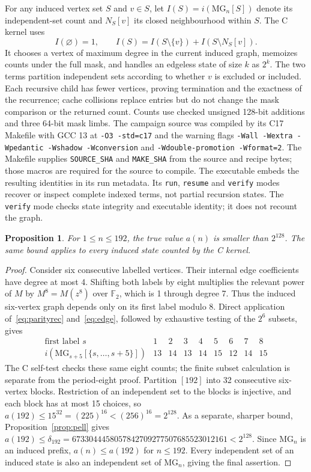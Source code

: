 \documentclass[11pt,a4paper]{article}
\newtheorem{proposition}{Proposition}[section]
\newcommand{\MG}{\mathrm{MG}}
\begin{document}
For any induced vertex set $S$ and $v\in S$, let
$I(S)=i(\MG_n[S])$ denote its
independent-set count and $N_S[v]$ its closed neighbourhood within $S$.
The C kernel uses
\begin{equation}\label{eq:deletion}
 I(\varnothing)=1,\qquad
 I(S)=I(S\setminus\{v\})+I(S\setminus N_S[v]).
\end{equation}
It chooses a vertex of maximum degree in the current induced graph,
memoizes counts under the full mask, and handles an edgeless state of size
$k$ as $2^k$.  The two terms partition independent sets according to
whether $v$ is excluded or included.  Each recursive child has fewer
vertices, proving termination and the exactness of the recurrence; cache
collisions replace entries but do not change the mask comparison or the
returned count.  Counts use checked unsigned 128-bit additions and three
64-bit mask limbs.  The campaign source was compiled by its C17 Makefile
with GCC 13 at \texttt{-O3 -std=c17} and the warning flags
\texttt{-Wall -Wextra -Wpedantic -Wshadow -Wconversion}
and \texttt{-Wdouble-promotion -Wformat=2}.  The Makefile supplies
\texttt{SOURCE\_SHA} and \texttt{MAKE\_SHA} from the source and recipe
bytes; those macros are required for the source to compile.  The
executable embeds the resulting identities in its run metadata.
Its \texttt{run}, \texttt{resume} and
\texttt{verify} modes recover or inspect complete indexed terms, not partial
recursion states.  The \texttt{verify} mode checks state integrity and
executable identity; it does not recount the graph.

\begin{proposition}\label{prop:capacity}
For $1\leq n\leq192$, the true value $a(n)$ is smaller than $2^{128}$.
The same bound applies to every induced state counted by the C kernel.
\end{proposition}
\begin{proof}
Consider six consecutive labelled vertices.  Their internal edge
coefficients have degree at most 4.  Shifting both labels by eight
multiplies the relevant power of $M$ by $M^8=M(z^8)$ over
$\mathbb F_2$, which is 1 through degree 7.  Thus the induced
six-vertex graph depends only on its first label modulo 8.
Direct application of~\eqref{eq:parityrec} and~\eqref{eq:edge},
followed by exhaustive testing of the $2^6$ subsets, gives
\[
\begin{array}{c|rrrrrrrr}
\text{first label }s&1&2&3&4&5&6&7&8\\ \hline
i(\MG_{s+5}[\{s,\ldots,s+5\}])&13&14&13&14&15&12&14&15
\end{array}
\]
The C self-test checks these same eight counts; the finite subset
calculation is separate from the period-eight proof.  Partition $[192]$ into
32 consecutive six-vertex blocks.  Restriction of an independent set
to the blocks is injective, and each block has at most 15 choices, so
$a(192)\leq15^{32}=(225)^{16}<(256)^{16}=2^{128}$.
As a separate, sharper bound,
Proposition~\ref{prop:pell} gives
$a(192)\leq\delta_{192}
=6733044458057842709277507685523012161<2^{128}$.
Since $\MG_n$ is an induced prefix,
$a(n)\leq a(192)$ for $n\leq192$.  Every independent set of an induced
state is also an independent set of $\MG_n$, giving the final assertion.
\end{proof}
\end{document}
